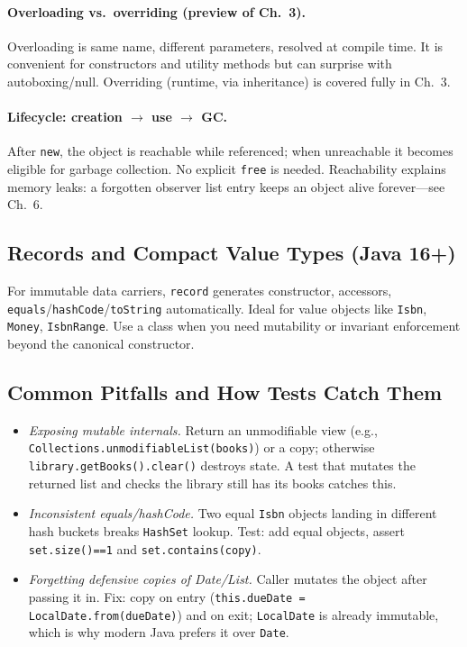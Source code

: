 \paragraph{Overloading vs.\ overriding (preview of Ch.~3).} Overloading is same name, different parameters, resolved at compile time. It is convenient for constructors and utility methods but can surprise with autoboxing/null. Overriding (runtime, via inheritance) is covered fully in Ch.~3.

\paragraph{Lifecycle: creation $\to$ use $\to$ GC.} After \texttt{new}, the object is reachable while referenced; when unreachable it becomes eligible for garbage collection. No explicit \texttt{free} is needed. Reachability explains memory leaks: a forgotten observer list entry keeps an object alive forever---see Ch.~6.

\subsection{Records and Compact Value Types (Java 16+)}
For immutable data carriers, \texttt{record} generates constructor, accessors, \texttt{equals}/\texttt{hashCode}/\texttt{toString} automatically.
Ideal for value objects like \texttt{Isbn}, \texttt{Money}, \texttt{IsbnRange}. Use a class when you need mutability or invariant enforcement beyond the canonical constructor.

\subsection{Common Pitfalls and How Tests Catch Them}
\begin{itemize}[itemsep=0.25em]
    \item \emph{Exposing mutable internals.} Return an unmodifiable view (e.g., \texttt{Collections.unmodifiableList(books)}) or a copy; otherwise \texttt{library.getBooks().clear()} destroys state. A test that mutates the returned list and checks the library still has its books catches this.
    \item \emph{Inconsistent equals/hashCode.} Two equal \texttt{Isbn} objects landing in different hash buckets breaks \texttt{HashSet} lookup. Test: add equal objects, assert \texttt{set.size()==1} and \texttt{set.contains(copy)}.
    \item \emph{Forgetting defensive copies of Date/List.} Caller mutates the object after passing it in. Fix: copy on entry (\texttt{this.dueDate = LocalDate.from(dueDate)}) and on exit; \texttt{LocalDate} is already immutable, which is why modern Java prefers it over \texttt{Date}.
\end{itemize}

